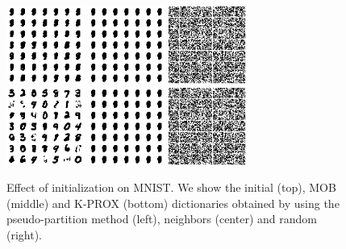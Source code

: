 \documentclass[twocolumn]{IEEEtran}
\theoremstyle{definition}
\begin{document}
%
\begin{figure}[tp]
\centering\includegraphics[height=1.0in]{fig/mnist_init_part0.png} %
\includegraphics[height=1.0in]{fig/mnist_init_neigh0.png} %
\includegraphics[height=1.0in]{fig/mnist_init_rand0.png}\\[1ex]%
\includegraphics[height=1.0in]{fig/mnist_init_part1.png} %
\includegraphics[height=1.0in]{fig/mnist_init_neigh1.png} %
\includegraphics[height=1.0in]{fig/mnist_init_rand1.png}%
\caption{\label{fig:init-mnist} Effect of initialization on MNIST. We show the initial (top), MOB (middle) and K-PROX (bottom) dictionaries obtained by using the pseudo-partition method (left), neighbors (center) and random (right).}
\end{figure}
%
\end{document}
